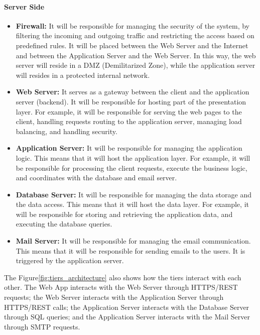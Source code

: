 \paragraph{Server Side}
\begin{itemize}
    \item \textbf{Firewall:} It will be responsible for managing the security of the system, by filtering the incoming and outgoing traffic and restricting
    the access based on predefined rules. It will be placed between the Web Server and the Internet and between the Application Server and the Web Server.
    In this way, the web server will reside in a DMZ (Demilitarized Zone), while the application server will resides in a protected internal network.
    \item \textbf{Web Server:} It serves as a gateway between the client and the application server (backend). It will be responsible for hosting part 
    of the presentation layer. For example, it will be responsible for serving the web pages to the client, handling requests routing to the application
    server, managing load balancing, and handling security.
    \item \textbf{Application Server:} It will be responsible for managing the application logic. This means that it will host the application layer. For 
    example, it will be responsible for processing the client requests, execute the business logic, and coordinates with the database and email server.
    \item \textbf{Database Server:} It will be responsible for managing the data storage and the data access. This means that it will host the data layer.
    For example, it will be responsible for storing and retrieving the application data, and executing the database queries.
    \item \textbf{Mail Server:} It will be responsible for managing the email communication. This means that it will be responsible for sending emails to 
    the users. It is triggered by the application server.
\end{itemize}

The Figure\ref{fig:tiers_architecture} also shows how the tiers interact with each other. The Web App interacts with the Web Server through HTTPS/REST 
requests; the Web Server interacts with the Application Server through HTTPS/REST calls; the Application Server interacts with the Database Server through 
SQL queries; and the Application Server interacts with the Mail Server through SMTP requests.




